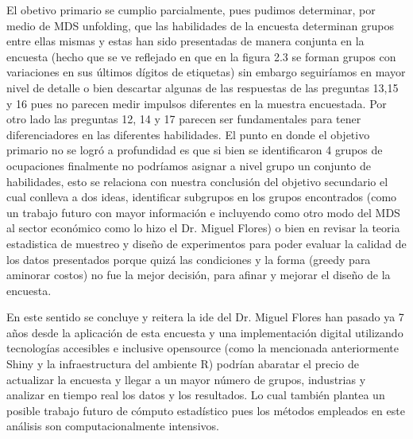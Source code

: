 \documentclass[paper=letter, fontsize=11pt]{scrartcl}
\numberwithin{equation}{section} %
\numberwithin{figure}{section} %
\numberwithin{table}{section} %
\begin{document}
El obetivo primario se cumplio parcialmente, pues pudimos determinar, por medio de MDS unfolding, que las habilidades de la encuesta determinan grupos entre ellas mismas y estas han sido presentadas de manera conjunta en la encuesta (hecho que se ve reflejado en que en la figura 2.3 se forman grupos con variaciones en sus últimos dígitos de etiquetas) sin embargo seguiríamos en mayor nivel de detalle o bien descartar algunas de las respuestas de las preguntas 13,15 y 16 pues no parecen medir impulsos diferentes en la muestra encuestada. Por otro lado las preguntas 12, 14 y 17 parecen ser fundamentales para tener diferenciadores en las diferentes habilidades. El punto en donde el objetivo primario no se logró a profundidad es que si bien se identificaron 4 grupos de ocupaciones finalmente no podríamos asignar a nivel grupo un conjunto de habilidades, esto se relaciona con nuestra conclusión del objetivo secundario el cual conlleva a dos ideas, identificar subgrupos en los grupos encontrados (como un trabajo futuro con mayor información e incluyendo como otro modo del MDS al sector económico como lo hizo el Dr. Miguel Flores) o bien en revisar la teoria estadistica de muestreo y diseño de experimentos para poder evaluar la calidad de los datos presentados porque quizá las condiciones y la forma (greedy para aminorar costos) no fue la mejor decisión, para afinar y mejorar el diseño de la encuesta.

En este sentido se concluye y reitera la ide del Dr. Miguel Flores han pasado ya 7 años desde la aplicación de esta encuesta y una implementación digital utilizando tecnologías accesibles e inclusive opensource (como la mencionada anteriormente Shiny y la infraestructura del ambiente R) podrían abaratar el precio de actualizar la encuesta y llegar a un mayor número de grupos, industrias y analizar en tiempo real los datos y los resultados. Lo cual también plantea un posible trabajo futuro de cómputo estadístico pues los métodos empleados en este análisis son computacionalmente intensivos.

 



\newpage
\end{document}
